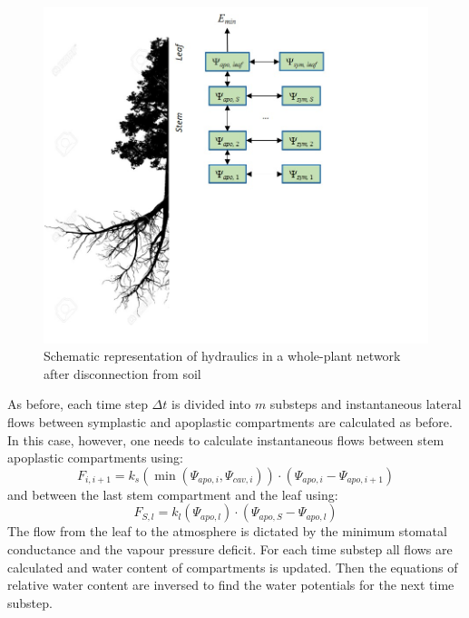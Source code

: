 \documentclass[]{book}
\begin{document}
\begin{figure}

{\centering \includegraphics[width=0.8\linewidth]{hydraulics_disc} 

}

\caption{Schematic representation of hydraulics in a whole-plant network after disconnection from soil}\label{fig:unnamed-chunk-69}
\end{figure}

As before, each time step \(\Delta t\) is divided into \(m\) substeps and instantaneous lateral flows between symplastic and apoplastic compartments are calculated as before. In this case, however, one needs to calculate instantaneous flows between stem apoplastic compartments using:
\begin{equation}
F_{i, i+1} = k_{s}(\min(\Psi_{apo,i}, \Psi_{cav, i})) \cdot (\Psi_{apo, i} - \Psi_{apo, i+1})
\end{equation}
and between the last stem compartment and the leaf using:
\begin{equation}
F_{S, l} = k_{l}(\Psi_{apo, l}) \cdot (\Psi_{apo, S} - \Psi_{apo, l})
\end{equation}
The flow from the leaf to the atmosphere is dictated by the minimum stomatal conductance and the vapour pressure deficit. For each time substep all flows are calculated and water content of compartments is updated. Then the equations of relative water content are inversed to find the water potentials for the next time substep.
\end{document}
